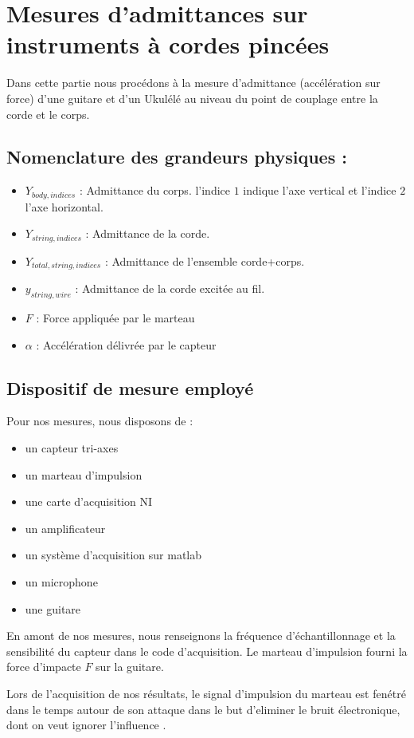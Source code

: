 \chapter{Mesures d'admittances sur instruments à cordes pincées}
Dans cette partie nous procédons à la mesure d'admittance (accélération sur force) d'une guitare et d'un Ukulélé au niveau du point de couplage entre la corde et le corps.
\section{Nomenclature des grandeurs physiques :} 
\begin{itemize}
\item $Y_{body,indices}$ : Admittance du corps. l'indice $1$ indique l'axe vertical et l'indice $2$ l'axe horizontal.
\item $Y_{string,indices}$ : Admittance de la corde.
\item $Y_{total,string,indices}$ : Admittance de l'ensemble corde+corps.
\item $y_{string,wire}$ : Admittance de la corde excitée au fil.
\item $F$ : Force appliquée par le marteau 
\item $\alpha$ : Accélération délivrée par le capteur 
\end{itemize}

\section{Dispositif de mesure employé}
Pour nos mesures, nous disposons de :
\begin{itemize}
\item un capteur tri-axes
\item un marteau d'impulsion
\item une carte d'acquisition NI
\item un amplificateur
\item un système d'acquisition sur matlab
\item un microphone
\item une guitare
\end{itemize}
En amont de nos mesures, nous renseignons la fréquence d'échantillonnage et la sensibilité du capteur dans le code d'acquisition. Le marteau d'impulsion fourni la force d'impacte $F$ sur la guitare. 

Lors de l'acquisition de nos résultats, le signal d'impulsion du marteau est fenétré dans le temps autour de son attaque dans le but d'eliminer le bruit électronique, dont on veut ignorer l'influence . 

